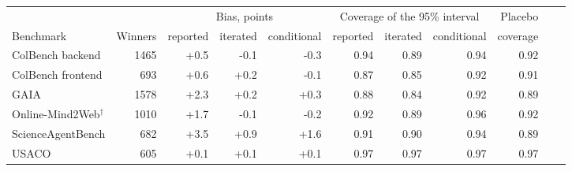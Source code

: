 \begin{tabular}{lrrrrrrrrrr}
\toprule
 & & \multicolumn{3}{c}{Bias, points} & \multicolumn{3}{c}{Coverage of the 95\% interval} & Placebo \\
Benchmark & Winners & reported & iterated & conditional & reported & iterated & conditional & coverage \\
\midrule
ColBench backend & 1465 & +0.5 & -0.1 & -0.3 & 0.94 & 0.89 & 0.94 & 0.92 \\
ColBench frontend & 693 & +0.6 & +0.2 & -0.1 & 0.87 & 0.85 & 0.92 & 0.91 \\
GAIA & 1578 & +2.3 & +0.2 & +0.3 & 0.88 & 0.84 & 0.92 & 0.89 \\
Online-Mind2Web$^{\dagger}$ & 1010 & +1.7 & -0.1 & -0.2 & 0.92 & 0.89 & 0.96 & 0.92 \\
ScienceAgentBench & 682 & +3.5 & +0.9 & +1.6 & 0.91 & 0.90 & 0.94 & 0.89 \\
USACO & 605 & +0.1 & +0.1 & +0.1 & 0.97 & 0.97 & 0.97 & 0.97 \\
\bottomrule
\end{tabular}
